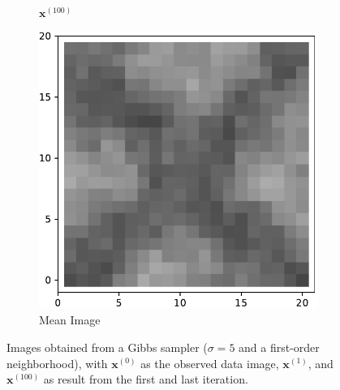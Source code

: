 \begin{figure}[!h]
\begin{subfigure}[b]{0.24\textwidth}
            \caption[]%
            {{\small $\mathbf{x}^{(100)}$}}    
            \label{fig:5d1100}
        \end{subfigure}
        \begin{subfigure}[b]{0.24\textwidth}   
            \centering 
            \includegraphics[width=\textwidth]{./img/5d1mean.pdf}
            \caption[]%
            {{\small Mean Image}}    
            \label{fig:5d1mean}
        \end{subfigure}
        \caption[]
        {\small Images obtained from a Gibbs sampler ($\sigma=5$ and a first-order neighborhood), with $\mathbf{x}^{(0)}$ as the observed data image, $\mathbf{x}^{(1)}$, and $\mathbf{x}^{(100)}$ as result from the first and last iteration. }
        \label{fig:5d1}
    \end{figure}
